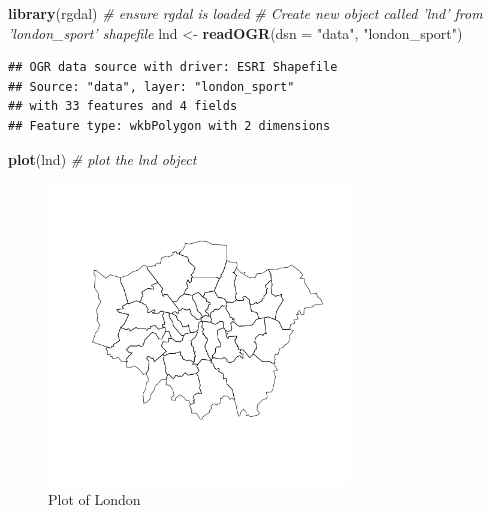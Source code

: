 \documentclass[]{article}
\newenvironment{Shaded}{}{}
\newcommand{\KeywordTok}[1]{\textcolor[rgb]{0.00,0.44,0.13}{\textbf{{#1}}}}
\newcommand{\DataTypeTok}[1]{\textcolor[rgb]{0.56,0.13,0.00}{{#1}}}
\newcommand{\StringTok}[1]{\textcolor[rgb]{0.25,0.44,0.63}{{#1}}}
\newcommand{\CommentTok}[1]{\textcolor[rgb]{0.38,0.63,0.69}{\textit{{#1}}}}
\newcommand{\NormalTok}[1]{{#1}}
\let\Oldincludegraphics\includegraphics
\renewcommand{\includegraphics}[1]{\Oldincludegraphics[width=8cm]{#1}}
\begin{document}
\begin{Shaded}
\begin{Highlighting}[]
\KeywordTok{library}\NormalTok{(rgdal)  }\CommentTok{# ensure rgdal is loaded}
\CommentTok{# Create new object called 'lnd' from 'london_sport' shapefile}
\NormalTok{lnd <- }\KeywordTok{readOGR}\NormalTok{(}\DataTypeTok{dsn =} \StringTok{"data"}\NormalTok{, }\StringTok{"london_sport"}\NormalTok{)}
\end{Highlighting}
\end{Shaded}
\begin{verbatim}
## OGR data source with driver: ESRI Shapefile 
## Source: "data", layer: "london_sport"
## with 33 features and 4 fields
## Feature type: wkbPolygon with 2 dimensions
\end{verbatim}
\begin{Shaded}
\begin{Highlighting}[]

\KeywordTok{plot}\NormalTok{(lnd)  }\CommentTok{# plot the lnd object }
\end{Highlighting}
\end{Shaded}
\begin{figure}[htbp]
\centering
\includegraphics{figure/Plot_of_London.png}
\caption{Plot of London}
\end{figure}
\end{document}
